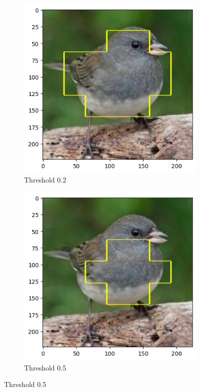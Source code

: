 \begin{figure}
\begin{subfigure}[b]{0.45\textwidth}
		\centering\includegraphics[width=.9\textwidth]{img/parameters/gradcam/threshold_02}
		\caption{Threshold 0.2}  \label{rys:parameters_lime_numsamples_1000}
	\end{subfigure}
	\begin{subfigure}[b]{0.45\textwidth}
		\centering\includegraphics[width=.9\textwidth]{img/parameters/gradcam/threshold_05}
		\caption{Threshold 0.5}  \label{rys:parameters_lime_numsamples_1000}

\end{subfigure}
\end{figure}
